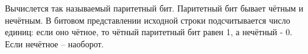 Вычислется так называемый паритетный бит. Паритетный бит бывает чётным и нечётным. В битовом
представлении исходной строки подсчитывается число единиц: если оно чётное, то чётный паритетный бит равен 1, а
нечётный \-- 0. Если нечётное \--- наоборот.